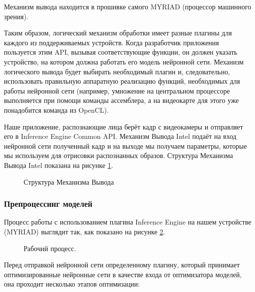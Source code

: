 \documentclass[12pt,a4paper]{scrartcl}
\begin{document}
			Механизм вывода находится в прошивке самого MYRIAD (процессор машинного зрения).
			
			Таким образом, логический механизм обработки имеет разные плагины для каждого из поддерживаемых устройств. Когда разработчик приложения пользуется этим API, вызывая соответствующие функции, он должен указать устройство, на котором должна работать его модель нейронной сети.	Механизм логического вывода будет выбирать необходимый плагин и, следовательно, использовать правильную аппаратную реализацию функций, необходимых для работы нейронной сети (например, умножение на центральном процессоре выполняется при помощи команды ассемблера, а на видеокарте для этого уже понадобится команда из OpenCL).
			
			Наше приложение, распознающие лица берёт кадр с видеокамеры и отправляет его в Inference Engine Common API. Механизм Вывода Intel подаёт на вход нейронной сети полученный кадр и на выходе мы получаем параметры, которые мы используем для отрисовки распознанных образов. Структура Механизма Вывода Intel показана на рисунке \ref{fig:Inference_Engine}\cite{bib:Intel_CV_School}.
			
			\begin{figure}[h]
				\caption{Структура Механизма Вывода}
				\label{fig:Inference_Engine}
			\end{figure}
		
		\subsubsection{Препроцессинг моделей}
		
			Процесс работы с использованием плагина Inference Engine на нашем устройстве (MYRIAD) выглядит так, как показано на рисунке \ref{fig:End_To_End_Workflow}.
			
			\begin{figure}[h]
				\caption{Рабочий процесс.}
				\label{fig:End_To_End_Workflow}
			\end{figure}
			
			Перед отправкой нейронной сети определенному плагину, который принимает оптимизированные нейронные сети в качестве входа от оптимизатора моделей, она проходит несколько этапов оптимизации:
			
\end{document}
